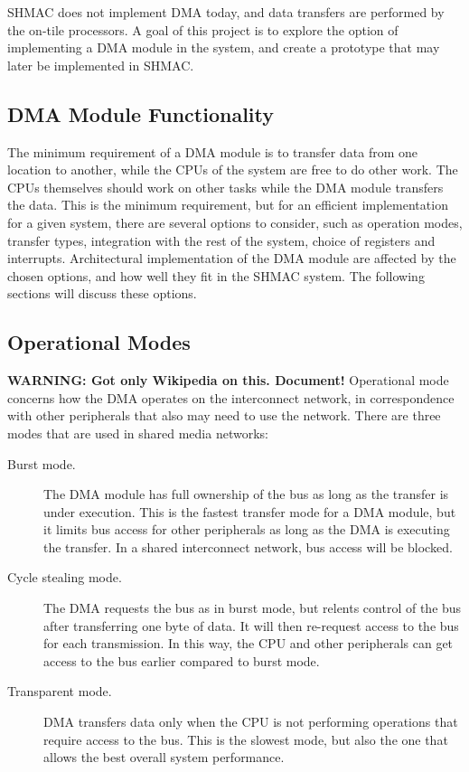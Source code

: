 SHMAC does not implement DMA today, and data transfers are performed by the on-tile processors.
A goal of this project is to explore the option of implementing a DMA module in the system, and create a prototype that may later be implemented in SHMAC.

\subsection{DMA Module Functionality}
The minimum requirement of a DMA module is to transfer data from one location to another, while the CPUs of the system are free to do other work.
The CPUs themselves should work on other tasks while the DMA module transfers the data.
This is the minimum requirement, but for an efficient implementation for a given system, there are several options to consider, such as operation modes, transfer types, integration with the rest of the system, choice of registers and interrupts.
Architectural implementation of the DMA module are affected by the chosen options, and how well they fit in the SHMAC system.
The following sections will discuss these options.

\subsection{Operational Modes}
\textbf{WARNING: Got only Wikipedia on this. Document!}
Operational mode concerns how the DMA operates on the interconnect network, in correspondence with other peripherals that also may need to use the network.
There are three modes that are used in shared media networks:

\begin{description}
    \item[Burst mode.]
    The DMA module has full ownership of the bus as long as the transfer is under execution.
    This is the fastest transfer mode for a DMA module, but it limits bus access for other peripherals as long as the DMA is executing the transfer.
    In a shared interconnect network, bus access will be blocked.
    \item[Cycle stealing mode.]
    The DMA requests the bus as in burst mode, but relents control of the bus after transferring one byte of data.
    It will then re-request access to the bus for each transmission.
    In this way, the CPU and other peripherals can get access to the bus earlier compared to burst mode. 
    \item[Transparent mode.]
    DMA transfers data only when the CPU is not performing operations that require access to the bus.
    This is the slowest mode, but also the one that allows the best overall system performance.
\end{description}

